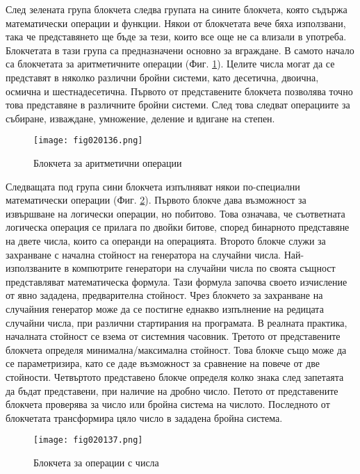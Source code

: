 След зелената група блокчета следва групата на сините блокчета, която съдържа математически операции и функции. Някои от блокчетата вече бяха използвани, така че представянето ще бъде за тези, които все още не са влизали в употреба. Блокчетата в тази група са предназначени основно за вграждане. В самото начало са блокчетата за аритметичните операции (Фиг. \ref{fig020136}). Целите числа могат да се представят в няколко различни бройни системи, като десетична, двоична, осмична и шестнадесетична. Първото от представените блокчета позволява точно това представяне в различните бройни системи. След това следват операциите за събиране, изваждане, умножение, деление и вдигане на степен. 

\begin{figure}[H]
  \centering
  \texttt{[image: fig020136.png]}
  \caption{Блокчета за аритметични операции}
\label{fig020136}
\end{figure}

Следващата под група сини блокчета изпълняват някои по-специални математически операции (Фиг. \ref{fig020137}). Първото блокче дава възможност за извършване на логически операции, но побитово. Това означава, че съответната логическа операция се прилага по двойки битове, според бинарното представяне на двете числа, които са операнди на операцията. Второто блокче служи за захранване с начална стойност на генератора на случайни числа. Най-използваните в компютрите генератори на случайни числа по своята същност представляват математическа формула. Тази формула започва своето изчисление от явно зададена, предварителна стойност. Чрез блокчето за захранване на случайния генератор може да се постигне еднакво изпълнение на редицата случайни числа, при различни стартирания на програмата. В реалната практика, началната стойност се взема от системния часовник. Третото от представените блокчета определя минимална/максимална стойност. Това блокче също може да се параметризира, като се даде възможност за сравнение на повече от две стойности. Четвъртото представено блокче определя колко знака след запетаята да бъдат представени, при наличие на дробно число. Петото от представените блокчета проверява за число или бройна система на числото. Последното от блокчетата трансформира цяло число в зададена бройна система. 

\begin{figure}[H]
  \centering
  \texttt{[image: fig020137.png]}
  \caption{Блокчета за операции с числа}
\label{fig020137}
\end{figure}


